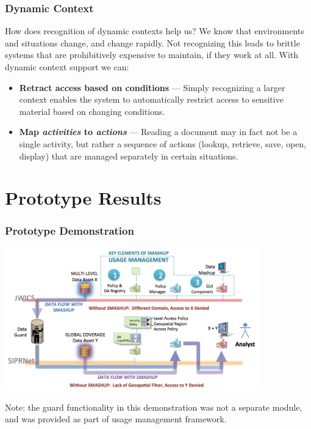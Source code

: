 \documentclass[t,handout, 10pt]{beamer}
\begin{document}
\begin{frame}
\frametitle{Dynamic Context}
How does recognition of dynamic contexts help us?
\newline
\newline
\pause
We know that environments and situations change, and change rapidly.  Not recognizing this leads to brittle systems that are prohibitively expensive to maintain, if they work at all.
\newline
\newline
\pause
With dynamic context support we can:
\begin{itemize}
\item \textbf{Retract access based on conditions} --- Simply recognizing a larger context enables the system to automatically restrict access to sensitive material based on changing conditions.
\pause
\item\textbf{Map \textit{activities} to \textit{actions}} --- Reading a document may in fact not be a single activity, but rather a sequence of actions (lookup, retrieve, save, open, display) that are managed separately in certain situations.
\end{itemize}
\end{frame}

\section{Prototype Results}

\begin{frame}\frametitle{Prototype Demonstration}
  \centerline{\includegraphics[width=4.35in]{demo.png}}
  {\small Note:  the guard functionality in this demonstration was not a separate module, and was provided as part of usage management framework.}
\end{frame} 
\end{document}
